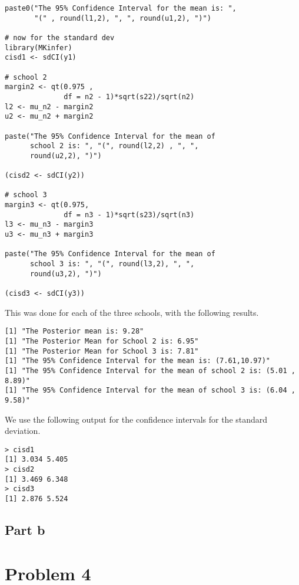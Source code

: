 \documentclass[12pt, letterpaper]{article}
\begin{document}
\begin{verbatim}
paste0("The 95% Confidence Interval for the mean is: ", 
       "(" , round(l1,2), ", ", round(u1,2), ")")

# now for the standard dev
library(MKinfer)
cisd1 <- sdCI(y1)

# school 2
margin2 <- qt(0.975 , 
              df = n2 - 1)*sqrt(s22)/sqrt(n2)
l2 <- mu_n2 - margin2
u2 <- mu_n2 + margin2

paste("The 95% Confidence Interval for the mean of
      school 2 is: ", "(", round(l2,2) , ", ", 
      round(u2,2), ")")

(cisd2 <- sdCI(y2))

# school 3 
margin3 <- qt(0.975, 
              df = n3 - 1)*sqrt(s23)/sqrt(n3)
l3 <- mu_n3 - margin3
u3 <- mu_n3 + margin3

paste("The 95% Confidence Interval for the mean of 
      school 3 is: ", "(", round(l3,2), ", ",
      round(u3,2), ")")

(cisd3 <- sdCI(y3))
\end{verbatim} 

This was done for each of the three schools, with the following results.
 
\begin{verbatim}
[1] "The Posterior mean is: 9.28"
[1] "The Posterior Mean for School 2 is: 6.95"
[1] "The Posterior Mean for School 3 is: 7.81"
[1] "The 95% Confidence Interval for the mean is: (7.61,10.97)"
[1] "The 95% Confidence Interval for the mean of school 2 is: (5.01 , 8.89)"
[1] "The 95% Confidence Interval for the mean of school 3 is: (6.04 , 9.58)" 
\end{verbatim} 

We use the following output for the confidence intervals for the standard deviation. 

\begin{verbatim} 
> cisd1
[1] 3.034 5.405 
> cisd2
[1] 3.469 6.348
> cisd3
[1] 2.876 5.524
\end{verbatim} 

\subsection{Part b}











\section{Problem 4}
\end{document}
